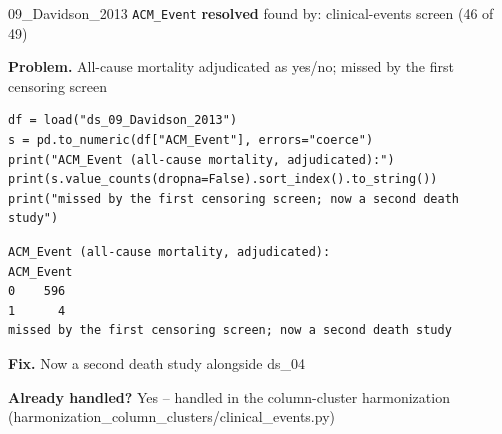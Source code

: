 \documentclass[9pt, t, handout]{beamer}
\newcommand{\ans}[1]{\textcolor{structure.fg}{#1}}
\begin{document}
\begin{frame}[fragile]{09\_Davidson\_2013 \quad \texttt{ACM\_Event}}
  {\scriptsize\textcolor{green!45!black}{\textbf{resolved}} \quad
   found by: clinical-events screen \quad (46 of 49)}
  \vspace{3pt}

  {\footnotesize \textbf{Problem.} All-cause mortality adjudicated as yes/no; missed by the first censoring screen}
  \vspace{4pt}

  \begin{Verbatim}[fontsize=\tiny, frame=single, framesep=2pt, label=\tiny reproduce]
df = load("ds_09_Davidson_2013")
s = pd.to_numeric(df["ACM_Event"], errors="coerce")
print("ACM_Event (all-cause mortality, adjudicated):")
print(s.value_counts(dropna=False).sort_index().to_string())
print("missed by the first censoring screen; now a second death study")
  \end{Verbatim}
  \begin{Verbatim}[fontsize=\tiny, frame=single, framesep=2pt, label=\tiny output]
ACM_Event (all-cause mortality, adjudicated):
ACM_Event
0    596
1      4
missed by the first censoring screen; now a second death study
  \end{Verbatim}
  \vspace{2pt}

  {\footnotesize \textbf{Fix.} Now a second death study alongside ds\_04}
  \vspace{2pt}

  {\footnotesize \textbf{Already handled?} \ans{Yes} -- handled in the column-cluster harmonization
   (harmonization\_column\_clusters/clinical\_events.py)}
\end{frame}
\end{document}
